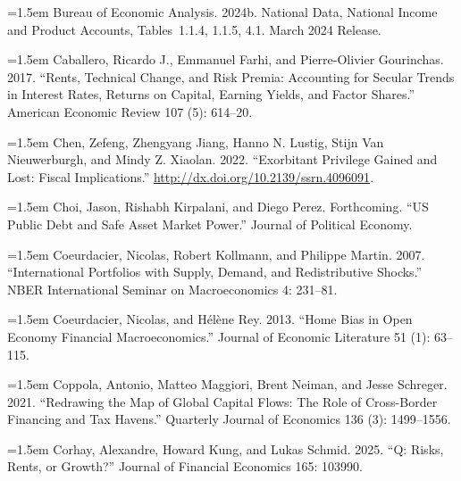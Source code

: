 \documentclass[11pt]{article}
\begin{document}
\noindent\hangindent=1.5em Bureau of Economic Analysis. 2024b. National Data, National Income and Product Accounts, Tables 1.1.4, 1.1.5, 4.1. March 2024 Release.\par

\noindent\hangindent=1.5em Caballero, Ricardo J., Emmanuel Farhi, and Pierre-Olivier Gourinchas. 2017. “Rents, Technical Change, and Risk Premia: Accounting for Secular Trends in Interest Rates, Returns on Capital, Earning Yields, and Factor Shares.” American Economic Review 107 (5): 614–20.\par

\noindent\hangindent=1.5em Chen, Zefeng, Zhengyang Jiang, Hanno N. Lustig, Stijn Van Nieuwerburgh, and Mindy Z. Xiaolan. 2022. “Exorbitant Privilege Gained and Lost: Fiscal Implications.” \url{http://dx.doi.org/10.2139/ssrn.4096091}.\par

\noindent\hangindent=1.5em Choi, Jason, Rishabh Kirpalani, and Diego Perez. Forthcoming. “US Public Debt and Safe Asset Market Power.” Journal of Political Economy.\par

\noindent\hangindent=1.5em Coeurdacier, Nicolas, Robert Kollmann, and Philippe Martin. 2007. “International Portfolios with Supply, Demand, and Redistributive Shocks.” NBER International Seminar on Macroeconomics 4: 231–81.\par

\noindent\hangindent=1.5em Coeurdacier, Nicolas, and Hélène Rey. 2013. “Home Bias in Open Economy Financial Macroeconomics.” Journal of Economic Literature 51 (1): 63–115.\par

\noindent\hangindent=1.5em Coppola, Antonio, Matteo Maggiori, Brent Neiman, and Jesse Schreger. 2021. “Redrawing the Map of Global Capital Flows: The Role of Cross-Border Financing and Tax Havens.” Quarterly Journal of Economics 136 (3): 1499–1556.\par

\noindent\hangindent=1.5em Corhay, Alexandre, Howard Kung, and Lukas Schmid. 2025. “Q: Risks, Rents, or Growth?” Journal of Financial Economics 165: 103990.\par
\end{document}
